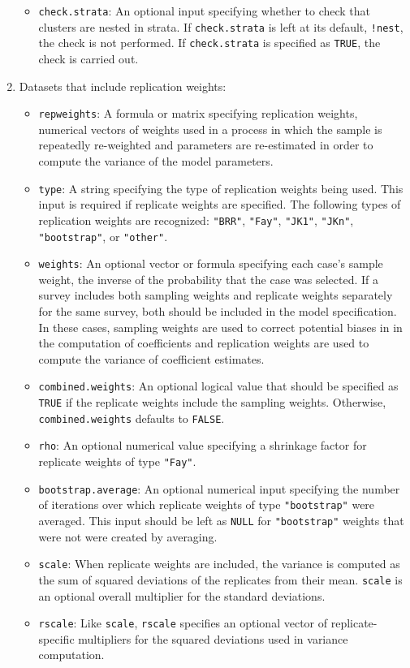 \begin{enumerate}
\begin{itemize}
\item {\tt check.strata}: An optional input specifying whether to 
check that clusters are nested in strata.  If {\tt check.strata} is 
left at its default, {\tt !nest}, the check is not performed.  If 
{\tt check.strata} is specified as {\tt TRUE}, the check is carried 
out.  

\end{itemize}

\item Datasets that include replication weights:
\begin{itemize}
  \item {\tt repweights}: A formula or matrix specifying
    replication weights, numerical vectors of weights used
    in a process in which the sample is repeatedly re-weighted and parameters
    are re-estimated in order to compute the variance of the model parameters.
  \item {\tt type}: A string specifying the type of replication weights being used.
    This input is required if replicate weights are specified.  The following types
    of replication weights are recognized: {\tt"BRR"}, {\tt "Fay"},
    {\tt "JK1"}, {\tt "JKn"}, {\tt "bootstrap"}, or {\tt "other"}.
  \item {\tt weights}: An optional vector or formula specifying each case's sample weight,
    the inverse of the probability that the case was selected.  If a survey includes both sampling 
    weights and replicate weights separately for the same survey, both should be included in 
    the model specification.  In these cases, sampling weights are used to correct potential biases 
    in in the computation of coefficients and replication weights are used to compute the variance 
    of coefficient estimates.  
  \item {\tt combined.weights}: An optional logical value that 
    should be specified as {\tt TRUE} if the replicate weights include the sampling weights.  Otherwise, 
    {\tt combined.weights} defaults to {\tt FALSE}.  
  \item {\tt rho}:  An optional numerical value specifying a shrinkage factor
    for replicate weights of type {\tt "Fay"}.
  \item {\tt bootstrap.average}: An optional numerical input specifying
    the number of iterations over which replicate weights of type {\tt "bootstrap"} were averaged. 
    This input should be left as {\tt NULL} for {\tt "bootstrap"} weights that were
    not were created by averaging.
\item {\tt scale}:  When replicate weights are included,
    the variance is computed as the sum of squared deviations of the replicates from their mean.
    {\tt scale} is an optional overall multiplier for the standard deviations.
\item {\tt rscale}: Like {\tt scale}, {\tt rscale} specifies an 
optional vector of replicate-specific multipliers for the squared 
deviations used in variance computation. 


\end{itemize}
\end{enumerate}
